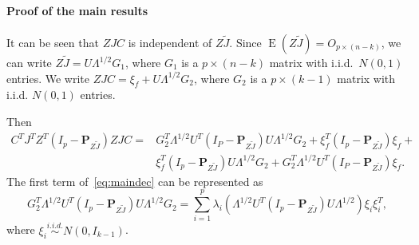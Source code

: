 \documentclass[12pt]{article} %
\DeclareMathOperator{\myE}{E}
\newcommand{\bP}{\mathbf{P}}
\theoremstyle{definition}
\begin{document}
\paragraph{Proof of the main results}

It can be seen that $ZJC$ is independent of ${Z\tilde{J}}$.
Since
$
\myE (Z\tilde{J}) = O_{p\times (n-k)}
$,
we can write
$
Z\tilde{J} = U\Lambda^{1/2} G_1
$,
where $G_1$ is a $p\times (n-k)$ matrix with i.i.d.\ $N(0,1)$ entries.
We write
$
ZJC = \xi_f + U\Lambda^{1/2} G_2
$, 
where $G_2$ is a $p\times (k-1)$ matrix with i.i.d. $N(0,1)$ entries.

Then 
\begin{equation}\label{eq:maindec}
\begin{aligned}
C^TJ^T Z^T(I_p-\bP_{Z\tilde J}) ZJC
=&
G_2^T \Lambda^{1/2}U^T (I_P-\bP_{Z\tilde{J}})U\Lambda^{1/2}G_2+
\xi_f^T (I_p -\bP_{Z\tilde{J}})\xi_f+\\
&\xi_f^T (I_p -\bP_{Z\tilde{J}})U\Lambda^{1/2}G_2+
G_2^T \Lambda^{1/2}U^T (I_P-\bP_{Z\tilde{J}})\xi_f.
\end{aligned}
\end{equation}
    The first term of~\eqref{eq:maindec} can be represented as
\begin{equation}\label{eq:firstTerm}
G_2^T \Lambda^{1/2}U^T (I_p-\bP_{Z\tilde{J}})U\Lambda^{1/2}G_2=
\sum_{i=1}^p \lambda_i (\Lambda^{1/2}U^T (I_p-\bP_{Z\tilde{J}})U\Lambda^{1/2})\xi_i \xi_i^T,
\end{equation}
where $\xi_i\overset{i.i.d.}{\sim} N(0,I_{k-1})$.
\end{document}
